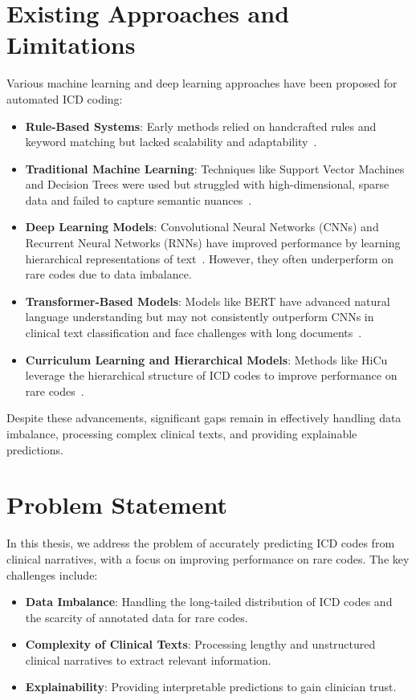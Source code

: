 \documentclass[12pt,a4paper]{report}
\begin{document}
\section{Existing Approaches and Limitations}
Various machine learning and deep learning approaches have been proposed for automated ICD coding:
\begin{itemize}
    \item \textbf{Rule-Based Systems}: Early methods relied on handcrafted rules and keyword matching but lacked scalability and adaptability~\cite{farkas2008automatic}.
    \item \textbf{Traditional Machine Learning}: Techniques like Support Vector Machines and Decision Trees were used but struggled with high-dimensional, sparse data and failed to capture semantic nuances~\cite{perotte2014diagnosis}.
    \item \textbf{Deep Learning Models}: Convolutional Neural Networks (CNNs) and Recurrent Neural Networks (RNNs) have improved performance by learning hierarchical representations of text~\cite{mullenbach2018explainable, vu2020label}. However, they often underperform on rare codes due to data imbalance.
    \item \textbf{Transformer-Based Models}: Models like BERT have advanced natural language understanding but may not consistently outperform CNNs in clinical text classification and face challenges with long documents~\cite{dong2022automated, gao2021limitations}.
    \item \textbf{Curriculum Learning and Hierarchical Models}: Methods like HiCu leverage the hierarchical structure of ICD codes to improve performance on rare codes~\cite{ren2022hicu}.
\end{itemize}

Despite these advancements, significant gaps remain in effectively handling data imbalance, processing complex clinical texts, and providing explainable predictions.

\section{Problem Statement}
In this thesis, we address the problem of accurately predicting ICD codes from clinical narratives, with a focus on improving performance on rare codes. The key challenges include:
\begin{itemize}
    \item \textbf{Data Imbalance}: Handling the long-tailed distribution of ICD codes and the scarcity of annotated data for rare codes.
    \item \textbf{Complexity of Clinical Texts}: Processing lengthy and unstructured clinical narratives to extract relevant information.
    \item \textbf{Explainability}: Providing interpretable predictions to gain clinician trust.
\end{itemize}
\end{document}
